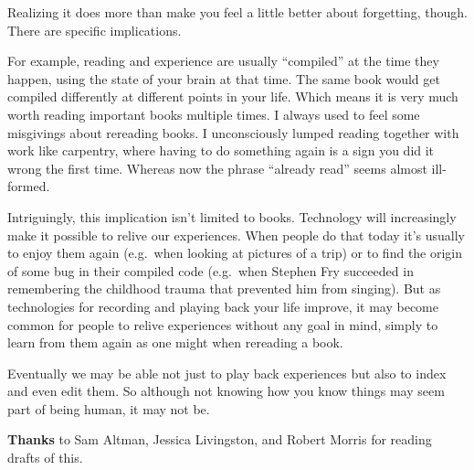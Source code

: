 Realizing it does more than make you feel a little better about
forgetting, though. There are specific implications.

For example, reading and experience are usually ``compiled'' at the time
they happen, using the state of your brain at that time. The same book
would get compiled differently at different points in your life. Which
means it is very much worth reading important books multiple times. I
always used to feel some misgivings about rereading books. I
unconsciously lumped reading together with work like carpentry, where
having to do something again is a sign you did it wrong the first time.
Whereas now the phrase ``already read'' seems almost ill-formed.

Intriguingly, this implication isn't limited to books. Technology will
increasingly make it possible to relive our experiences. When people do
that today it's usually to enjoy them again (e.g.~when looking at
pictures of a trip) or to find the origin of some bug in their compiled
code (e.g.~when Stephen Fry succeeded in remembering the childhood
trauma that prevented him from singing). But as technologies for
recording and playing back your life improve, it may become common for
people to relive experiences without any goal in mind, simply to learn
from them again as one might when rereading a book.

Eventually we may be able not just to play back experiences but also to
index and even edit them. So although not knowing how you know things
may seem part of being human, it may not be.

\textbf{Thanks} to Sam Altman, Jessica Livingston, and Robert Morris for
reading drafts of this.